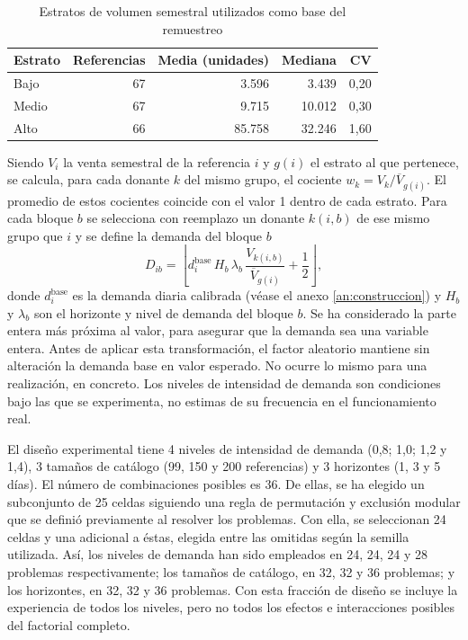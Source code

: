 \begin{table}[H]\centering\small
\caption{Estratos de volumen semestral utilizados como base del remuestreo}\label{tab:estratos100}
\begin{tabular}{lrrrr}\toprule
Estrato & Referencias & Media (unidades) & Mediana & CV\\\midrule
Bajo & 67 & 3.596 & 3.439 & 0,20\\
Medio & 67 & 9.715 & 10.012 & 0,30\\
Alto & 66 & 85.758 & 32.246 & 1,60\\\bottomrule
\end{tabular}
\end{table}

Siendo $V_i$ la venta semestral de la referencia $i$ y $g(i)$ el estrato al que pertenece, se calcula, para cada donante $k$ del mismo grupo, el cociente $w_k=V_k/\overline V_{g(i)}$. El promedio de estos cocientes coincide con el valor 1 dentro de cada estrato. Para cada bloque $b$ se selecciona con reemplazo un donante $k(i,b)$ de ese mismo grupo que $i$ y se define la demanda del bloque $b$
\begin{equation}
	D_{ib}=\left\lfloor d_i^{\mathrm{base}}\,H_b\,\lambda_b\,\frac{V_{k(i,b)}}{\overline V_{g(i)}}+\frac12\right\rfloor,
	\label{eq:demanda100}
\end{equation}
donde $d_i^{\mathrm{base}}$ es la demanda diaria calibrada (véase el anexo \ref{an:construccion}) y $H_b$ y $\lambda_b$ son el horizonte y nivel de demanda del bloque $b$. Se ha considerado la parte entera más próxima al valor, para asegurar que la demanda sea una variable entera. Antes de aplicar esta transformación, el factor aleatorio mantiene sin alteración la demanda base en valor esperado. No ocurre lo mismo para una realización, en concreto. Los niveles de intensidad de demanda son condiciones bajo las que se experimenta, no estimas de su frecuencia en el funcionamiento real.

El diseño experimental tiene 4 niveles de intensidad de demanda (0,8; 1,0; 1,2 y 1,4), 3 tamaños de catálogo (99, 150 y 200 referencias) y 3 horizontes (1, 3 y 5 días). El número de combinaciones posibles es 36. De ellas, se ha elegido un subconjunto de 25 celdas siguiendo una regla de permutación y exclusión modular que se definió previamente al resolver los problemas. Con ella, se seleccionan 24 celdas y una adicional a éstas, elegida entre las omitidas según la semilla utilizada. Así, los niveles de demanda han sido empleados en 24, 24, 24 y 28 problemas respectivamente; los tamaños de catálogo, en 32, 32 y 36 problemas; y los horizontes, en 32, 32 y 36 problemas. Con esta fracción de diseño se incluye la experiencia de todos los niveles, pero no todos los efectos e interacciones posibles del factorial completo.

